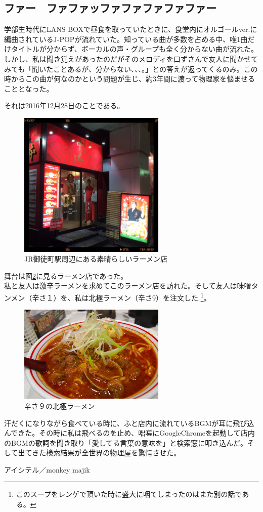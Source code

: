 \documentclass[12pt]{jsarticle}
\begin{document}
\newpage
\subsection{ファー　ファファッファファファファファー}
学部生時代にLANS BOXで昼食を取っていたときに、食堂内にオルゴールver.に編曲されているJ-POPが流れていた。知っている曲が多数を占める中、唯1曲だけタイトルが分からず、ボーカルの声・グループも全く分からない曲が流れた。しかし、私は聞き覚えがあったのだがそのメロディを口ずさんで友人に聞かせてみても「聞いたことあるが、分からない、、、。」との答えが返ってくるのみ。この時からこの曲が何なのかという問題が生じ、約3年間に渡って物理家を悩ませることとなった。\par
それは2016年12月28日のことである。
\begin{figure}[h]
  \centering
  \includegraphics[width=7cm]{./picture/mouko_tanmen.jpg}
  \caption[]{JR御徒町駅周辺にある素晴らしいラーメン店}
  \label{fig_hoge1}
\end{figure}
舞台は図\ref{fig_hoge2}に見るラーメン店であった。\\私と友人は激辛ラーメンを求めてこのラーメン店を訪れた。そして友人は味噌タンメン（辛さ１）を、私は北極ラーメン（辛さ9）を注文した
\footnote{このスープをレンゲで頂いた時に盛大に咽てしまったのはまた別の話である。}。
\begin{figure}[h]
  \centering
  \includegraphics[width=7cm]{./picture/hokkyoku.jpg}
  \caption[]{辛さ９の北極ラーメン}
  \label{fig_hoge2}
\end{figure}
汗だくになりながら食べている時に、ふと店内に流れているBGMが耳に飛び込んできた。その時に私は飛べるのを止め、咄嗟にGoogleChromeを起動して店内のBGMの歌詞を聞き取り「愛してる言葉の意味を」と検索窓に叩き込んだ。そして出てきた検索結果が全世界の物理屋を驚愕させた。\\
\begin{center}
アイシテル／monkey majik
\end{center}
\newpage
\end{document}
